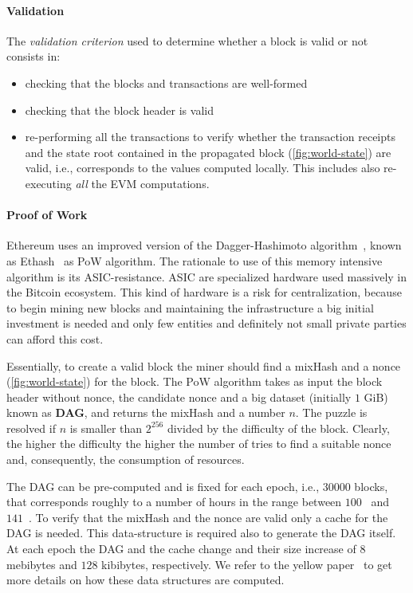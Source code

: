 \paragraph{Validation}
The \emph{validation criterion} used to determine whether a block is valid or
not consists in:
\begin{itemize}
  \item checking that the blocks and transactions are well-formed
  \item checking that the block header is valid
  \item re-performing all the transactions to verify whether the transaction
  receipts and the state root contained in the propagated block
  (\autoref{fig:world-state}) are valid, i.e., corresponds to the values
  computed locally. This includes also re-executing \emph{all} the EVM
  computations.
\end{itemize}

\paragraph{Proof of Work}
Ethereum uses an improved version of the Dagger-Hashimoto
algorithm~\cite{bib:dagger-hashimoto}, known as Ethash~\cite[Appendix
J]{wood2018ethereum} as PoW algorithm. The rationale to use of this memory
intensive algorithm is its ASIC-resistance. ASIC are specialized hardware used
massively in the Bitcoin ecosystem. This kind of hardware is a risk for
centralization, because to begin mining new blocks and maintaining the
infrastructure a big initial investment is needed and only few entities and
definitely not small private parties can afford this cost.

Essentially, to create a valid block the miner should find a mixHash and a nonce
(\autoref{fig:world-state}) for the block. The PoW algorithm takes as input the
block header without nonce, the candidate nonce and a big dataset (initially $1$
GiB) known as \textbf{DAG}, and returns the mixHash and a number $n$. The puzzle
is resolved if $n$ is smaller than $2^{256}$ divided by the difficulty of the
block. Clearly, the higher the difficulty the higher the number of tries to find
a suitable nonce and, consequently, the consumption of resources.

The DAG can be pre-computed and is fixed for each epoch, i.e., $30000$ blocks,
that corresponds roughly to a number of hours in the range between
$100$~\cite{bib:ethereum-wiki-mining} and $141$~\cite{bib:solidity-docs}. To
verify that the mixHash and the nonce are valid only a cache for the DAG is
needed. This data-structure is required also to generate the DAG itself. At each
epoch the DAG and the cache change and their size increase of $8$ mebibytes and
$128$ kibibytes, respectively. We refer to the yellow paper~\cite[Appendix
J]{wood2018ethereum} to get more details on how these data structures are
computed.



